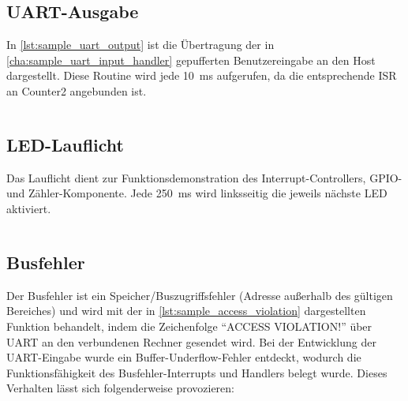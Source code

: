 \begin{code}
	\inputminted[autogobble, firstline=153, lastline=169, firstnumber=153]{C}{attachments/Plasma-SoC/sw/examples/src/sample.c}
	\caption{Display-Refresh}
	\label{lst:sample_display_flush}
\end{code}

\subsection{UART-Ausgabe}

In \cref{lst:sample_uart_output} ist die Übertragung der in \cref{cha:sample_uart_input_handler} gepufferten Benutzereingabe an den Host dargestellt. Diese Routine wird jede \SI{10}{\milli\second} aufgerufen, da die entsprechende \gls{ISR} an Counter2 angebunden ist.

\begin{code}
	\inputminted[autogobble, firstline=171, lastline=174, firstnumber=171]{C}{attachments/Plasma-SoC/sw/examples/src/sample.c}
	\caption{UART Ausgabe}
	\label{lst:sample_uart_output}
\end{code}

\subsection{LED-Lauflicht}

Das Lauflicht dient zur Funktionsdemonstration des Interrupt-Controllers, GPIO- und Zähler-Komponente. Jede \SI{250}{\milli\second} wird linksseitig die jeweils nächste LED aktiviert. 
\begin{code}
	\inputminted[autogobble, firstline=176, lastline=193, firstnumber=176]{C}{attachments/Plasma-SoC/sw/examples/src/sample.c}
	\caption{LED Lauflicht}
	\label{lst:sample_led_band}
\end{code}

\subsection{Busfehler}

Der Busfehler ist ein Speicher/Buszugriffsfehler (Adresse außerhalb des gültigen Bereiches) und wird mit der in \cref{lst:sample_access_violation} dargestellten Funktion behandelt, indem die Zeichenfolge \enquote{ACCESS VIOLATION!} über \gls{UART} an den verbundenen Rechner gesendet wird. 
Bei der Entwicklung der \gls{UART}-Eingabe wurde ein Buffer-Underflow-Fehler entdeckt, wodurch die Funktionsfähigkeit des Busfehler-Interrupts und Handlers belegt wurde. 
Dieses Verhalten lässt sich folgenderweise provozieren:

